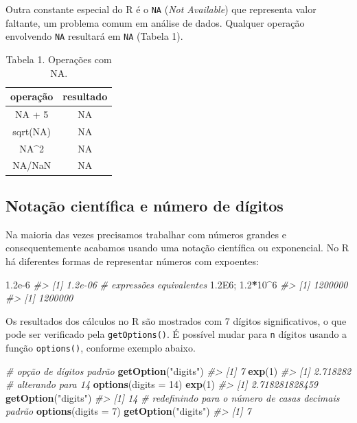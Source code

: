 \documentclass[]{book}
\newenvironment{Shaded}{\begin{snugshade}}{\end{snugshade}}
\newcommand{\KeywordTok}[1]{\textcolor[rgb]{0.13,0.29,0.53}{\textbf{#1}}}
\newcommand{\DataTypeTok}[1]{\textcolor[rgb]{0.13,0.29,0.53}{#1}}
\newcommand{\DecValTok}[1]{\textcolor[rgb]{0.00,0.00,0.81}{#1}}
\newcommand{\FloatTok}[1]{\textcolor[rgb]{0.00,0.00,0.81}{#1}}
\newcommand{\StringTok}[1]{\textcolor[rgb]{0.31,0.60,0.02}{#1}}
\newcommand{\CommentTok}[1]{\textcolor[rgb]{0.56,0.35,0.01}{\textit{#1}}}
\newcommand{\OperatorTok}[1]{\textcolor[rgb]{0.81,0.36,0.00}{\textbf{#1}}}
\newcommand{\NormalTok}[1]{#1}
\begin{document}
Outra constante especial do R é o \texttt{NA} (\emph{Not Available}) que
representa valor faltante, um problema comum em análise de dados.
Qualquer operação envolvendo \texttt{NA} resultará em \texttt{NA}
(Tabela 1).

\begin{table}

\caption{\label{tab:chunk19}Tabela 1. Operações com NA.}
\centering
\begin{tabular}[t]{c|c}
\hline
operação & resultado\\
\hline
NA + 5 & NA\\
\hline
sqrt(NA) & NA\\
\hline
NA\textasciicircum{}2 & NA\\
\hline
NA/NaN & NA\\
\hline
\end{tabular}
\end{table}

\subsection{Notação científica e número de
dígitos}\label{notacao-cientifica-e-numero-de-digitos}

Na maioria das vezes precisamos trabalhar com números grandes e
consequentemente acabamos usando uma notação científica ou exponencial.
No R há diferentes formas de representar números com expoentes:

\begin{Shaded}
\begin{Highlighting}[]
\FloatTok{1.2e-6}
\CommentTok{#> [1] 1.2e-06}
\CommentTok{# expressões equivalentes}
\FloatTok{1.2E6}\NormalTok{; }\FloatTok{1.2}\OperatorTok{*}\DecValTok{10}\OperatorTok{^}\DecValTok{6}  
\CommentTok{#> [1] 1200000}
\CommentTok{#> [1] 1200000}
\end{Highlighting}
\end{Shaded}

Os resultados dos cálculos no R são mostrados com 7 dígitos
significativos, o que pode ser verificado pela \texttt{getOptions()}. É
possível mudar para \texttt{n} dígitos usando a função
\texttt{options()}, conforme exemplo abaixo.

\begin{Shaded}
\begin{Highlighting}[]
\CommentTok{# opção de dígitos padrão}
\KeywordTok{getOption}\NormalTok{(}\StringTok{"digits"}\NormalTok{)}
\CommentTok{#> [1] 7}
\KeywordTok{exp}\NormalTok{(}\DecValTok{1}\NormalTok{)}
\CommentTok{#> [1] 2.718282}
\CommentTok{# alterando para 14}
\KeywordTok{options}\NormalTok{(}\DataTypeTok{digits =} \DecValTok{14}\NormalTok{)}
\KeywordTok{exp}\NormalTok{(}\DecValTok{1}\NormalTok{)}
\CommentTok{#> [1] 2.718281828459}
\KeywordTok{getOption}\NormalTok{(}\StringTok{"digits"}\NormalTok{)}
\CommentTok{#> [1] 14}
\CommentTok{# redefinindo para o número de casas decimais padrão}
\KeywordTok{options}\NormalTok{(}\DataTypeTok{digits =} \DecValTok{7}\NormalTok{)}
\KeywordTok{getOption}\NormalTok{(}\StringTok{"digits"}\NormalTok{)}
\CommentTok{#> [1] 7}
\end{Highlighting}
\end{Shaded}
\end{document}
